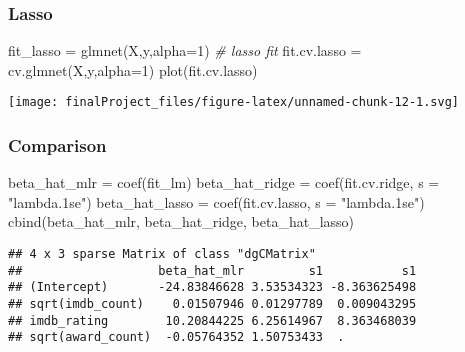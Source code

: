 \documentclass[
]{article}
\newenvironment{Shaded}{\begin{snugshade}}{\end{snugshade}}
\newcommand{\AttributeTok}[1]{\textcolor[rgb]{0.77,0.63,0.00}{#1}}
\newcommand{\CommentTok}[1]{\textcolor[rgb]{0.56,0.35,0.01}{\textit{#1}}}
\newcommand{\DecValTok}[1]{\textcolor[rgb]{0.00,0.00,0.81}{#1}}
\newcommand{\FunctionTok}[1]{\textcolor[rgb]{0.00,0.00,0.00}{#1}}
\newcommand{\NormalTok}[1]{#1}
\newcommand{\OtherTok}[1]{\textcolor[rgb]{0.56,0.35,0.01}{#1}}
\newcommand{\StringTok}[1]{\textcolor[rgb]{0.31,0.60,0.02}{#1}}
\begin{document}
\hypertarget{lasso}{%
\subsubsection{Lasso}\label{lasso}}

\begin{Shaded}
\begin{Highlighting}[]
\NormalTok{fit\_lasso }\OtherTok{=} \FunctionTok{glmnet}\NormalTok{(X,y,}\AttributeTok{alpha=}\DecValTok{1}\NormalTok{) }\CommentTok{\# lasso fit}
\NormalTok{fit.cv.lasso }\OtherTok{=} \FunctionTok{cv.glmnet}\NormalTok{(X,y,}\AttributeTok{alpha=}\DecValTok{1}\NormalTok{)}
\FunctionTok{plot}\NormalTok{(fit.cv.lasso)}
\end{Highlighting}
\end{Shaded}

\texttt{[image: finalProject\_files/figure-latex/unnamed-chunk-12-1.svg]}

\hypertarget{comparison}{%
\subsubsection{Comparison}\label{comparison}}

\begin{Shaded}
\begin{Highlighting}[]
\NormalTok{beta\_hat\_mlr }\OtherTok{=} \FunctionTok{coef}\NormalTok{(fit\_lm)}
\NormalTok{beta\_hat\_ridge }\OtherTok{=} \FunctionTok{coef}\NormalTok{(fit.cv.ridge, }\AttributeTok{s =} \StringTok{"lambda.1se"}\NormalTok{)}
\NormalTok{beta\_hat\_lasso }\OtherTok{=} \FunctionTok{coef}\NormalTok{(fit.cv.lasso, }\AttributeTok{s =} \StringTok{"lambda.1se"}\NormalTok{)}
\FunctionTok{cbind}\NormalTok{(beta\_hat\_mlr, beta\_hat\_ridge, beta\_hat\_lasso)}
\end{Highlighting}
\end{Shaded}

\begin{verbatim}
## 4 x 3 sparse Matrix of class "dgCMatrix"
##                   beta_hat_mlr         s1           s1
## (Intercept)       -24.83846628 3.53534323 -8.363625498
## sqrt(imdb_count)    0.01507946 0.01297789  0.009043295
## imdb_rating        10.20844225 6.25614967  8.363468039
## sqrt(award_count)  -0.05764352 1.50753433  .
\end{verbatim}
\end{document}
